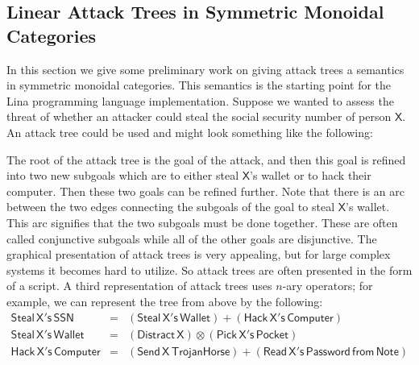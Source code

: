 \begin{full} 
\section{Linear Attack Trees in Symmetric Monoidal Categories}
\label{sec:attack_trees_in_monoidal_categories}
In this section we give some preliminary work on giving attack trees a
semantics in symmetric monoidal categories.  This semantics is the
starting point for the Lina programming language
implementation. Suppose we wanted to assess the threat of whether an
attacker could steal the social security number of person
$\mathsf{X}$. An attack tree could be used and might look something
like the following:
\begin{center}
\end{center}
The root of the attack tree is the goal of the attack, and then this
goal is refined into two new subgoals which are to either steal
$\mathsf{X}$'s wallet or to hack their computer.  Then these two goals
can be refined further.  Note that there is an arc between the two
edges connecting the subgoals of the goal to steal $\mathsf{X}$'s
wallet.  This arc signifies that the two subgoals must be done
together.  These are often called conjunctive subgoals while all of
the other goals are disjunctive.  The graphical presentation of attack
trees is very appealing, but for large complex systems it becomes hard
to utilize.  So attack trees are often presented in the form of a
script. A third representation of attack trees uses $n$-ary operators;
for example, we can represent the tree from above by the following:
\[
\begin{array}{rll}
  \mathsf{Steal\,X's\,SSN} & = & (\mathsf{Steal\,X's\,Wallet}) + (\mathsf{Hack\,X's\,Computer})\\
  \mathsf{Steal\,X's\,Wallet} & = & (\mathsf{Distract\,X}) \otimes (\mathsf{Pick\,X's\,Pocket})\\
  \mathsf{Hack\,X's\,Computer} & = & (\mathsf{Send\,X\,Trojan Horse}) + (\mathsf{Read\,X's\,Password\,from\,Note})\\
\end{array}
\]


\end{full}
